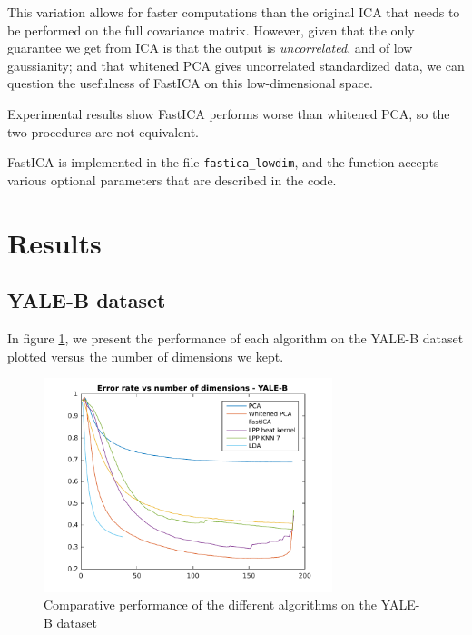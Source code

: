 \documentclass[10pt, a4paper]{article}
\begin{document}
This variation allows for faster computations than the original ICA that needs to be performed on the full covariance matrix. However, given that the only guarantee we get from ICA is that the output is \textit{uncorrelated}, and of low gaussianity; and that whitened PCA gives uncorrelated standardized data, we can question the usefulness of FastICA on this low-dimensional space.

Experimental results show FastICA performs worse than whitened PCA, so the two procedures are not equivalent.

FastICA is implemented in the file \texttt{fastica\_lowdim}, and the function accepts various optional parameters that are described in the code.

\newpage

\section{Results}

\subsection{YALE-B dataset}

In figure \ref{yaleb_all}, we present the performance of each algorithm on the YALE-B dataset plotted versus the number of dimensions we kept.

\begin{figure}[h!]
\centering
\includegraphics[width=0.75\textwidth]{yale/yale_all}
\caption{Comparative performance of the different algorithms on the YALE-B dataset}
\label{yaleb_all}
\end{figure}
\end{document}
